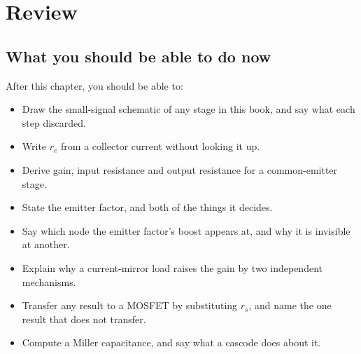 

\section{Review}
\label{c7:sec:review}

\subsection*{What you should be able to do now}
After this chapter, you should be able to:
\begin{itemize}
  \item Draw the small-signal schematic of any stage in this book, and say what each step discarded.
  \item Write $r_e$ from a collector current without looking it up.
  \item Derive gain, input resistance and output resistance for a common-emitter stage.
  \item State the emitter factor, and both of the things it decides.
  \item Say which node the emitter factor's boost appears at, and why it is invisible at another.
  \item Explain why a current-mirror load raises the gain by two independent mechanisms.
  \item Transfer any result to a MOSFET by substituting $r_s$, and name the one result that does not transfer.
  \item Compute a Miller capacitance, and say what a cascode does about it.
\end{itemize}

